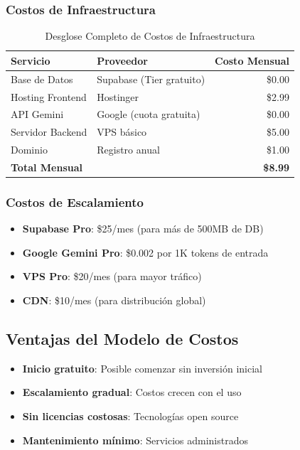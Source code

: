 \documentclass[12pt,a4paper]{report}
\begin{document}
\subsubsection{Costos de Infraestructura}
\begin{table}[h]
\centering
\begin{tabular}{|l|l|r|}
\hline
\textbf{Servicio} & \textbf{Proveedor} & \textbf{Costo Mensual} \\
\hline
Base de Datos & Supabase (Tier gratuito) & \$0.00 \\
Hosting Frontend & Hostinger & \$2.99 \\
API Gemini & Google (cuota gratuita) & \$0.00 \\
Servidor Backend & VPS básico & \$5.00 \\
Dominio & Registro anual & \$1.00 \\
\hline
\textbf{Total Mensual} & & \textbf{\$8.99} \\
\hline
\end{tabular}
\caption{Desglose Completo de Costos de Infraestructura}
\end{table}

\subsubsection{Costos de Escalamiento}
\begin{itemize}
    \item \textbf{Supabase Pro}: \$25/mes (para más de 500MB de DB)
    \item \textbf{Google Gemini Pro}: \$0.002 por 1K tokens de entrada
    \item \textbf{VPS Pro}: \$20/mes (para mayor tráfico)
    \item \textbf{CDN}: \$10/mes (para distribución global)
\end{itemize}

\subsection{Ventajas del Modelo de Costos}
\begin{itemize}
    \item \textbf{Inicio gratuito}: Posible comenzar sin inversión inicial
    \item \textbf{Escalamiento gradual}: Costos crecen con el uso
    \item \textbf{Sin licencias costosas}: Tecnologías open source
    \item \textbf{Mantenimiento mínimo}: Servicios administrados
\end{itemize}
\end{document}
